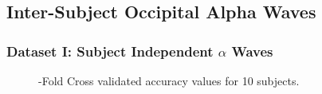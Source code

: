 \documentclass[11pt]{beamer}
\begin{document}
    \subsection{Inter-Subject Occipital Alpha Waves}
    \begin{frame}
        \frametitle{Dataset I: Subject Independent $\alpha $ Waves }        
   \begin{figure}[thpb]
      \centering
      \setlength\fboxsep{0pt}
	  \setlength\fboxrule{0.5pt}
      \caption{-Fold Cross validated accuracy values for 10 subjects.}
      \label{figure2}
   \end{figure}   
    \end{frame}
    
    
\end{document}
